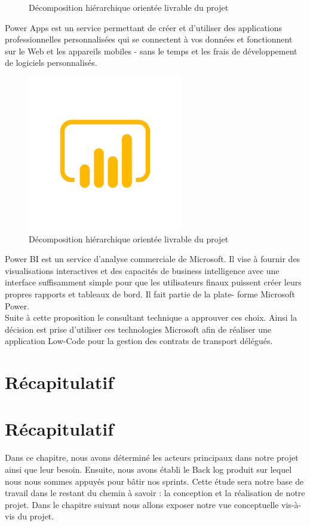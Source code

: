 \documentclass[a4paper]{report}
\begin{document}
\begin{doublespace}
\begin{figure}[H]
\begin{center}
			\caption{Décomposition hiérarchique orientée livrable du projet}
		\end{center}
	\end{figure}
	Power Apps est un service permettant de créer
	et d'utiliser des applications professionnelles
	personnalisées qui se connectent à vos
	données et fonctionnent sur le Web et les
	appareils mobiles - sans le temps et les frais
	de développement de logiciels personnalisés.
	\begin{figure}[H]
		\begin{center}
			\includegraphics[scale=1.1]{images/outilsREP.png}
			\caption{Décomposition hiérarchique orientée livrable du projet}
		\end{center}
	\end{figure}
	Power BI est un service d'analyse
	commerciale de Microsoft. Il vise à fournir des
	visualisations interactives et des capacités de
	business intelligence avec une interface
	suffisamment simple pour que les utilisateurs
	finaux puissent créer leurs propres rapports et
	tableaux de bord. Il fait partie de la plate-
	forme Microsoft Power.\\
	Suite à cette proposition le consultant technique a approuver ces choix. Ainsi la décision est prise d'utiliser ces technologies Microsoft afin de réaliser une application Low-Code pour la gestion des contrats de transport délégués.
	\section{Récapitulatif}
	\section{Récapitulatif}
	Dans ce chapitre, nous avons déterminé les acteurs principaux dans notre projet ainsi que leur
	besoin. Ensuite, nous avons établi le Back log produit sur lequel nous nous sommes appuyés
	pour bâtir nos sprints. Cette étude sera notre base de travail dans le restant du chemin à
	savoir : la conception et la réalisation de notre projet. Dans le chapitre suivant nous allons
	exposer notre vue conceptuelle vis-à-vis du projet.

\end{doublespace}
\end{document}

